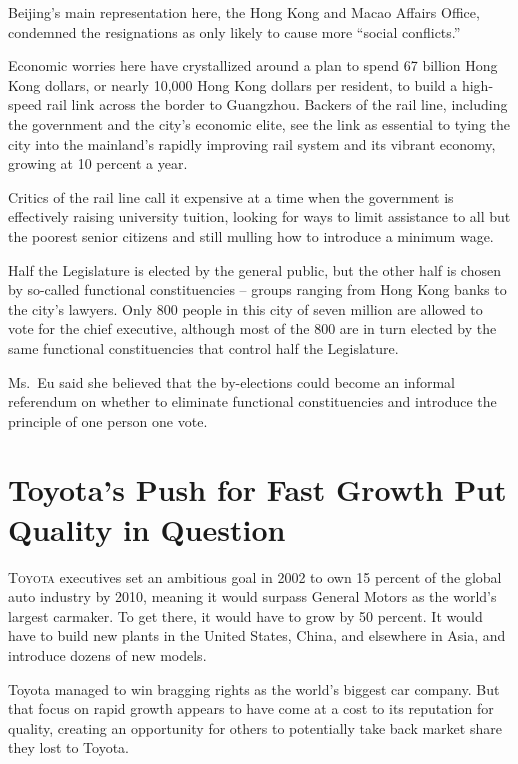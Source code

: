 ﻿\documentclass[12pt]{article}
\begin{document}
Beijing's main representation here, the Hong Kong and Macao Affairs Office, condemned the
resignations as only likely to cause more ``social conflicts.''

Economic worries here have crystallized around a plan to spend 67 billion Hong Kong dollars, or
nearly 10,000 Hong Kong dollars per resident, to build a high-speed rail link across the border to
Guangzhou. Backers of the rail line, including the government and the city's economic elite, see the
link as essential to tying the city into the mainland's rapidly improving rail system and its
vibrant economy, growing at 10 percent a year.

Critics of the rail line call it expensive at a time when the government is effectively raising
university tuition, looking for ways to limit assistance to all but the poorest senior citizens and
still mulling how to introduce a minimum wage.

Half the Legislature is elected by the general public, but the other half is chosen by so-called
functional constituencies -- groups ranging from Hong Kong banks to the city's lawyers. Only 800
people in this city of seven million are allowed to vote for the chief executive, although most of
the 800 are in turn elected by the same functional constituencies that control half the Legislature.

Ms.~Eu said she believed that the by-elections could become an informal referendum on whether to
eliminate functional constituencies and introduce the principle of one person one vote.

\section{Toyota's Push for Fast Growth Put Quality in Question}

\lettrine{T}{oyota} executives set an ambitious goal in 2002 to own 15
percent of the global auto industry by 2010, meaning it would surpass General Motors as the world's
largest carmaker. To get there, it would have to grow by 50 percent. It would have to build new
plants in the United States, China, and elsewhere in Asia, and introduce dozens of new models.

Toyota managed to win bragging rights as the world's biggest car company. But that focus on rapid
growth appears to have come at a cost to its reputation for quality, creating an opportunity for
others to potentially take back market share they lost to Toyota.
\end{document}
